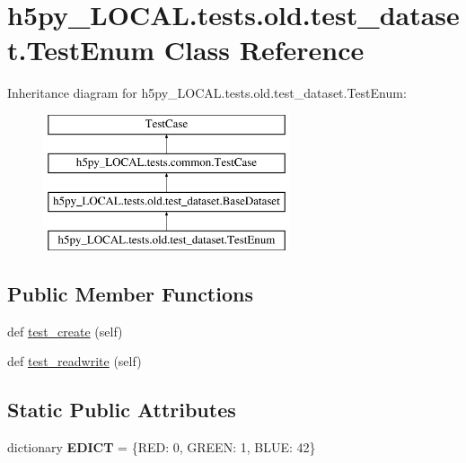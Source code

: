 \hypertarget{classh5py__LOCAL_1_1tests_1_1old_1_1test__dataset_1_1TestEnum}{}\section{h5py\+\_\+\+L\+O\+C\+A\+L.\+tests.\+old.\+test\+\_\+dataset.\+Test\+Enum Class Reference}
\label{classh5py__LOCAL_1_1tests_1_1old_1_1test__dataset_1_1TestEnum}
Inheritance diagram for h5py\+\_\+\+L\+O\+C\+A\+L.\+tests.\+old.\+test\+\_\+dataset.\+Test\+Enum\+:\begin{figure}[H]
\begin{center}
\leavevmode
\includegraphics[height=4.000000cm]{classh5py__LOCAL_1_1tests_1_1old_1_1test__dataset_1_1TestEnum}
\end{center}
\end{figure}
\subsection*{Public Member Functions}
\begin{DoxyCompactItemize}
\item 
def \hyperlink{classh5py__LOCAL_1_1tests_1_1old_1_1test__dataset_1_1TestEnum_ab9cba104cdc4e675f4f42120a2d172de}{test\+\_\+create} (self)
\item 
def \hyperlink{classh5py__LOCAL_1_1tests_1_1old_1_1test__dataset_1_1TestEnum_a81cfe9577dcef144d5af166523d0556b}{test\+\_\+readwrite} (self)
\end{DoxyCompactItemize}
\subsection*{Static Public Attributes}
\begin{DoxyCompactItemize}
\item 
\mbox{\label{classh5py__LOCAL_1_1tests_1_1old_1_1test__dataset_1_1TestEnum_a8e9ea450e4efde310941982095795ff1}} 
dictionary {\bfseries E\+D\+I\+CT} = \{\textquotesingle{}R\+ED\textquotesingle{}\+: 0, \textquotesingle{}G\+R\+E\+EN\textquotesingle{}\+: 1, \textquotesingle{}B\+L\+UE\textquotesingle{}\+: 42\}
\end{DoxyCompactItemize}
